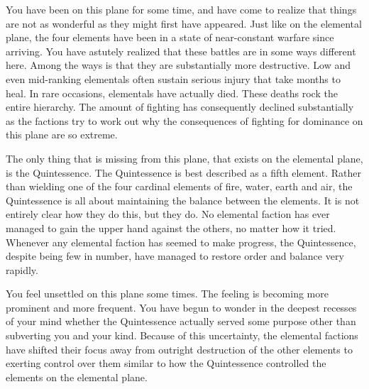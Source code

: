 \documentclass[blue]{elementals}
\begin{document}
\name{\bKnowQ{}}

You have been on this plane for some time, and have come to realize that things are not as wonderful as they might first have appeared. Just like on the elemental plane, the four elements have been in a state of near-constant warfare since arriving. You have astutely realized that these battles are in some ways different here. Among the ways is that they are substantially more destructive. Low and even mid-ranking elementals often sustain serious injury that take months to heal. In rare occasions, elementals have actually died. These deaths rock the entire hierarchy. The amount of fighting has consequently declined substantially as the factions try to work out why the consequences of fighting for dominance on this plane are so extreme.

The only thing that is missing from this plane, that exists on the elemental plane, is the Quintessence. The Quintessence is best described as a fifth element. Rather than wielding one of the four cardinal elements of fire, water, earth and air, the Quintessence is all about maintaining the balance between the elements. It is not entirely clear how they do this, but they do. No elemental faction has ever managed to gain the upper hand against the others, no matter how it tried. Whenever any elemental faction has seemed to make progress, the Quintessence, despite being few in number, have managed to restore order and balance very rapidly.

You feel unsettled on this plane some times. The feeling is becoming more prominent and more frequent. You have begun to wonder in the deepest recesses of your mind whether the Quintessence actually served some purpose other than subverting you and your kind. Because of this uncertainty, the elemental factions have shifted their focus away from outright destruction of the other elements to exerting control over them similar to how the Quintessence controlled the elements on the elemental plane.
\end{document}
